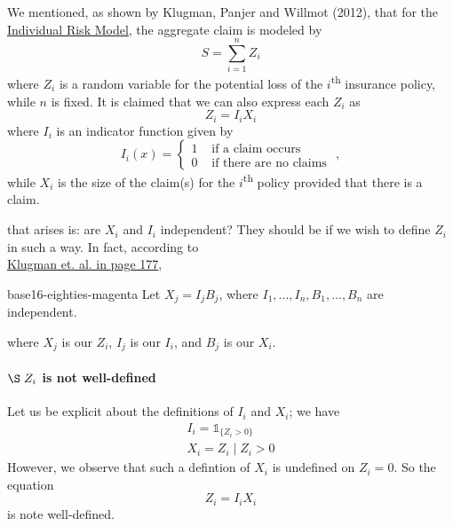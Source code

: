 \documentclass[notoc,notitlepage]{tufte-book}
\begin{document}
We mentioned, as shown by Klugman, Panjer and Willmot (2012)\cite{KlugmanPanjerWillmot2012}, that for the \hyperref[defn:individual_risk_model]{Individual Risk Model}, the aggregate claim is modeled by
\begin{equation*}
  S = \sum_{i=1}^{n} Z_i
\end{equation*}
where $Z_i$ is a random variable for the potential loss of the $i$\textsuperscript{th} insurance policy, while $n$ is fixed. It is claimed that we can also express each $Z_i$ as
\begin{equation*}
  Z_i = I_i X_i
\end{equation*}
where $I_i$ is an indicator function given by
\begin{equation*}
  I_i(x) = \begin{cases}
    1 & \text{ if a claim occurs } \\
    0 & \text{ if there are no claims }
  \end{cases},
\end{equation*}
while $X_i$ is the size of the claim(s) for the $i$\textsuperscript{th} policy provided that there is a claim.

 that arises is: are $X_i$ and $I_i$ independent? They should be if we wish to define $Z_i$ in such a way. In fact, according to \\
\noindent\textcolor{base16-eighties-magenta}{\underline{Klugman et. al. in page 177}},

\begin{quotebox}{base16-eighties-magenta}
  Let $X_j = I_j B_j$, where $I_1, ..., I_n, B_1, ..., B_n$ are independent.
\end{quotebox}

where $X_j$ is our $Z_i$, $I_j$ is our $I_i$, and $B_j$ is our $X_i$.

\paragraph{$\S \; Z_i$ is not well-defined} Let us be explicit about the definitions of $I_i$ and $X_i$; we have
\begin{gather*}
  I_i = \mathbb{1}_{\{ Z_i > 0 \}} \\
  X_i = Z_i \mid Z_i > 0
\end{gather*}
However, we observe that such a defintion of $X_i$ is undefined on $Z_i = 0$. So the equation
\begin{equation*}
  Z_i = I_i X_i
\end{equation*}
is note well-defined.
\end{document}

